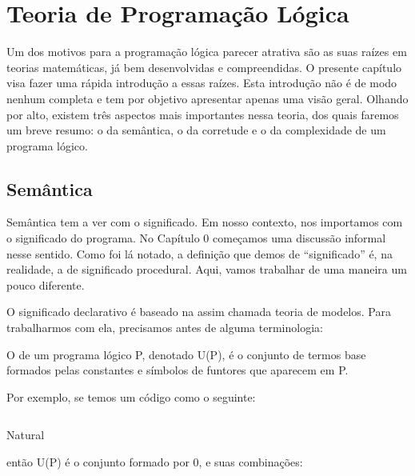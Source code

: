 
%

%
%
%


%

\section{Teoria de Programação Lógica}

Um dos motivos para a programação lógica parecer atrativa são as suas
raízes em teorias matemáticas, já bem desenvolvidas e compreendidas. O
presente capítulo visa fazer uma rápida introdução a essas
raízes. Esta introdução não é de modo nenhum completa e tem por
objetivo apresentar apenas uma visão geral. Olhando por alto, existem
três aspectos mais importantes nessa teoria, dos quais faremos um
breve resumo: o da semântica, o da corretude e o da complexidade de um
programa lógico.

\subsection{Semântica}
Semântica tem a ver com o significado. Em nosso contexto, nos
importamos com o significado do programa. No Capítulo 0 %
começamos uma discussão informal nesse sentido. Como foi lá notado, a
definição que demos de ``significado'' é, na realidade, a de
significado procedural. Aqui, vamos trabalhar de uma maneira um pouco
diferente.

O significado declarativo é baseado na assim chamada teoria de
modelos. Para trabalharmos com ela, precisamos antes de alguma
terminologia:

\begin{definition} O  de um programa
  lógico P, denotado U(P), é o conjunto de termos base formados pelas
  constantes e símbolos de funtores que aparecem em P. 
\end{definition}

Por exemplo, se temos um código como o seguinte:

\begin{listing}
  \inputminted{prolog}{../Exemplos/Cap2/prog1_natural.pl}
  \caption{Natural}\label{lst:natural}
\end{listing}

\noindent então U(P) é o conjunto formado por 0,
 e suas combinações:

